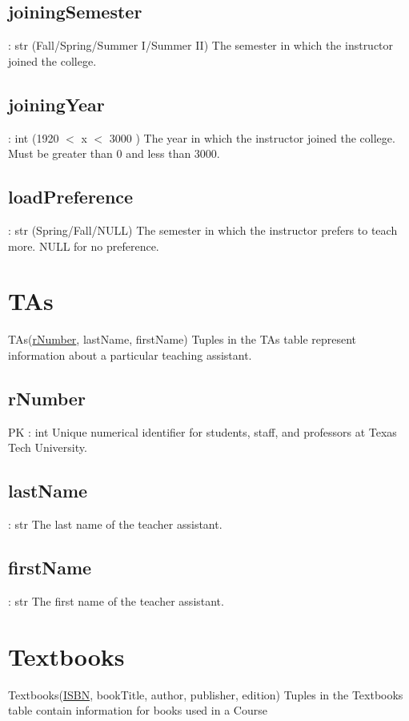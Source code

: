     \subsection{joiningSemester}
    	: str (Fall/Spring/Summer I/Summer II) 
    	The semester in which the instructor joined the college.
    
    \subsection{joiningYear}
    	: int (1920 $<$ x $<$ 3000 )
    	The year in which the instructor joined the college. Must be greater than 0 and less than 3000.
    
    \subsection{loadPreference}
    	: str (Spring/Fall/NULL)
    	The semester in which the instructor prefers to teach more. NULL for no preference.
    	
    
\section{TAs}
	TAs(\underline{rNumber}, lastName, firstName)
		Tuples in the TAs table represent information about a particular teaching assistant.

	\subsection{rNumber}
		PK : int 
		Unique numerical identifier for students, staff, and professors at Texas Tech University.
		
	\subsection{lastName}
		: str  
    	The last name of the teacher assistant.
    
    \subsection{firstName}
    	: str 
    	The first name of the teacher assistant.
	
\section{Textbooks}
	Textbooks(\underline{ISBN}, bookTitle, author, publisher, edition) 
		Tuples in the Textbooks table contain information for books used in a Course

